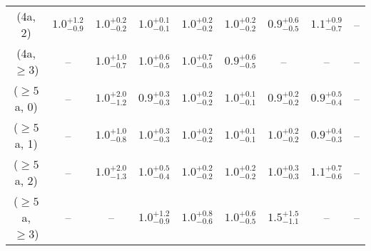 \begin{table}[h!]
{\begin{tabular}{ccccccccc}
	(4a, 2) & $1.0^{+ 1.2 }_{- 0.9 }$ & $1.0^{+ 0.2 }_{- 0.2 }$ & $1.0^{+ 0.1 }_{- 0.1 }$ & $1.0^{+ 0.2 }_{- 0.2 }$ & $1.0^{+ 0.2 }_{- 0.2 }$ & $0.9^{+ 0.6 }_{- 0.5 }$ & $1.1^{+ 0.9 }_{- 0.7 }$ & -- \\[0.5ex] 
	(4a, $\ge3$) & -- & $1.0^{+ 1.0 }_{- 0.7 }$ & $1.0^{+ 0.6 }_{- 0.5 }$ & $1.0^{+ 0.7 }_{- 0.5 }$ & $0.9^{+ 0.6 }_{- 0.5 }$ & -- & -- & -- \\[0.5ex] 
	($\ge5$a, 0) & -- & $1.0^{+ 2.0 }_{- 1.2 }$ & $0.9^{+ 0.3 }_{- 0.3 }$ & $1.0^{+ 0.2 }_{- 0.2 }$ & $1.0^{+ 0.1 }_{- 0.1 }$ & $0.9^{+ 0.2 }_{- 0.2 }$ & $0.9^{+ 0.5 }_{- 0.4 }$ & -- \\[0.5ex] 
	($\ge5$a, 1) & -- & $1.0^{+ 1.0 }_{- 0.8 }$ & $1.0^{+ 0.3 }_{- 0.3 }$ & $1.0^{+ 0.2 }_{- 0.2 }$ & $1.0^{+ 0.1 }_{- 0.1 }$ & $1.0^{+ 0.2 }_{- 0.2 }$ & $0.9^{+ 0.4 }_{- 0.3 }$ & -- \\[0.5ex] 
	($\ge5$a, 2) & -- & $1.0^{+ 2.0 }_{- 1.3 }$ & $1.0^{+ 0.5 }_{- 0.4 }$ & $1.0^{+ 0.2 }_{- 0.2 }$ & $1.0^{+ 0.2 }_{- 0.2 }$ & $1.0^{+ 0.3 }_{- 0.3 }$ & $1.1^{+ 0.7 }_{- 0.6 }$ & -- \\[0.5ex] 
	($\ge5$a, $\ge3$) & -- & -- & $1.0^{+ 1.2 }_{- 0.9 }$ & $1.0^{+ 0.8 }_{- 0.6 }$ & $1.0^{+ 0.6 }_{- 0.5 }$ & $1.5^{+ 1.5 }_{- 1.1 }$ & -- & -- \\[0.5ex] 
	\hline
	\hline
\end{tabular}}
\end{table}
